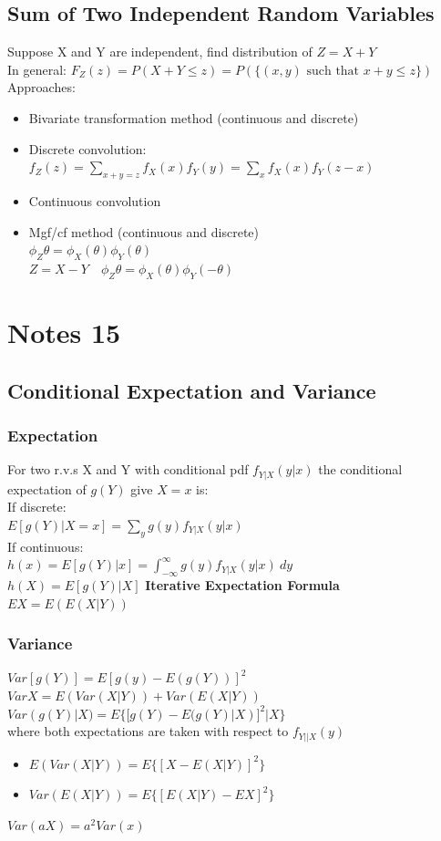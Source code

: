 \documentclass[openany]{book}
\begin{document}
\begin{flushleft}
\section{Sum of Two Independent Random Variables}
Suppose X and Y are independent, find distribution of $Z=X+Y$\\
In general: $F_Z(z)=P(X+Y\leq z)=P(\{(x,y) \text{ such that } x+y\leq z\})$\\
Approaches:
\begin{itemize}
\item Bivariate transformation method (continuous and discrete)\\
\item Discrete convolution:\\
$f_Z(z)=\sum_{x+y=z}f_X(x)f_Y(y)=\sum_{x}f_X(x)f_Y(z-x)$\\
\item Continuous convolution\\
\item Mgf/cf method (continuous and discrete)\\
$\phi_Z{\theta}=\phi_X(\theta)\phi_Y(\theta)$\\
$Z=X-Y \quad \phi_Z{\theta}=\phi_X(\theta)\phi_Y(-\theta)$
\end{itemize}
\chapter{Notes 15}
\section{Conditional Expectation and Variance}
\subsection{Expectation}
For two r.v.s X and Y with conditional pdf $f_{Y|X}(y|x)$ the conditional expectation of $g(Y)$ give $X=x$ is:\\
If discrete:\\
$E[g(Y)|X=x]=\sum_{y}g(y)f_{Y|X}(y|x)$\\
If continuous:\\
$h(x)=E[g(Y)|x]=\int_{-\infty}^{\infty}g(y)f_{Y|X}(y|x) \ dy$\\
$h(X)=E[g(Y)|X]$\medbreak
\textbf{Iterative Expectation Formula}\\
$EX=E(E(X|Y))$
\subsection{Variance}
$Var[g(Y)]=E[g(y)-E(g(Y))]^2$\medbreak
$VarX=E(Var(X|Y))+Var(E(X|Y))$\medbreak
$Var(g(Y)|X)=E\{[g(Y)-E(g(Y)|X)]^2|X\}$\\
where both expectations are taken with respect to $f_{Y||X}(y)$\\
\begin{itemize}
\item $E(Var(X|Y))=E\{[X-E(X|Y)]^2\}$\\
\item $Var(E(X|Y))=E\{[E(X|Y)-EX]^2\}$\\
\end{itemize}
$Var(aX)=a^2 Var(x)$

\end{flushleft}
\end{document}
